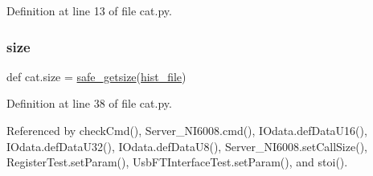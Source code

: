 Definition at line 13 of file cat.\+py.

\mbox{\label{namespacecat_a3eae50bb86a614752045105e00365a46}} 
\subsubsection{\texorpdfstring{size}{size}}
{\footnotesize\ttfamily def cat.\+size = \hyperlink{namespacecat_abd324a9da9ba2b9c5ae75515174616cd}{safe\+\_\+getsize}(\hyperlink{namespacecat_a5be1540f4d9418c1650b9bafbe8efa5a}{hist\+\_\+file})}



Definition at line 38 of file cat.\+py.



Referenced by check\+Cmd(), Server\+\_\+\+N\+I6008.\+cmd(), I\+Odata.\+def\+Data\+U16(), I\+Odata.\+def\+Data\+U32(), I\+Odata.\+def\+Data\+U8(), Server\+\_\+\+N\+I6008.\+set\+Call\+Size(), Register\+Test.\+set\+Param(), Usb\+F\+T\+Interface\+Test.\+set\+Param(), and stoi().

